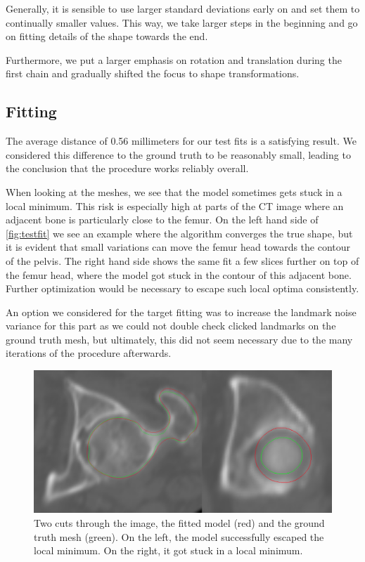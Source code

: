 Generally, it is sensible to use larger standard deviations early on and set them to continually smaller values.
This way, we take larger steps in the beginning and go on fitting details of the shape towards the end.

Furthermore, we put a larger emphasis on rotation and translation during the first chain and gradually shifted the focus to shape transformations.


\subsection{Fitting}
\label{subsec:testfit}

The average distance of 0.56 millimeters for our test fits is a satisfying result.
We considered this difference to the ground truth to be reasonably small, leading to the conclusion that the procedure works reliably overall. 

When looking at the meshes, we see that the model sometimes gets stuck in a local minimum.
This risk is especially high at parts of the CT image where an adjacent bone is particularly close to the femur. 
On the left hand side of \autoref{fig:testfit} we see an example where the algorithm converges the true shape, but it is evident that small variations can move the femur head towards the contour of the pelvis.
The right hand side shows the same fit a few slices further on top of the femur head, where the model got stuck in the contour of this adjacent bone.
Further optimization would be necessary to escape such local optima consistently.

An option we considered  for the target fitting was to increase the landmark noise variance for this part as we could not double check clicked landmarks on the ground truth mesh, but ultimately, this did not seem necessary due to the many iterations of the procedure afterwards.

\begin{figure}
	\centering
  \includegraphics[width=\columnwidth]{./Figures/local_minimum_comparison}
  \caption{
    Two cuts through the image, the fitted model (red) and the ground truth mesh (green).
    On the left, the model successfully escaped the local minimum.
    On the right, it got stuck in a local minimum.
  }
  \label{fig:testfit}
\end{figure}




